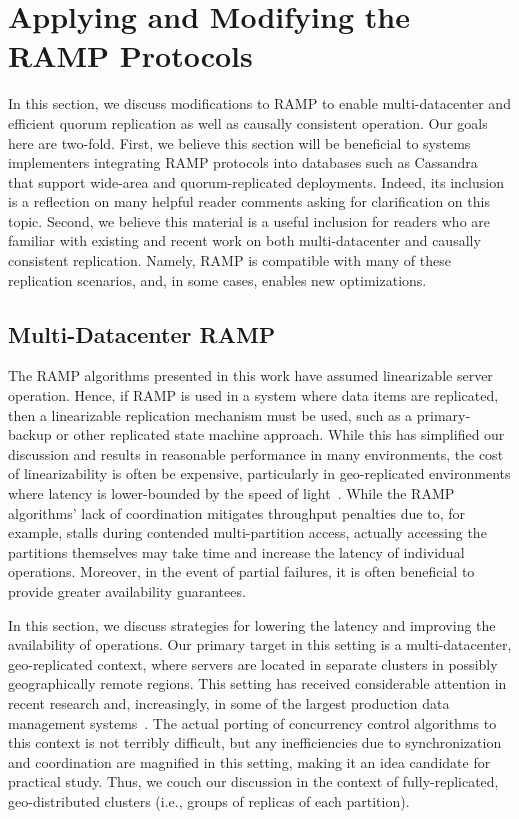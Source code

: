 
\section{Applying and Modifying the RAMP Protocols}
\label{sec:ramp-application}

In this section, we discuss modifications to RAMP to enable multi-datacenter and efficient quorum replication as well as causally consistent operation. Our goals here are two-fold. First, we believe this section will be beneficial to systems implementers integrating RAMP protocols into databases such as Cassandra~\cite{cassandra-sigmod} that support wide-area and quorum-replicated deployments. Indeed, its inclusion is a reflection on many helpful reader comments asking for clarification on this topic. Second, we believe this material is a useful inclusion for readers who are familiar with existing and recent work on both multi-datacenter and causally consistent replication. Namely, RAMP is compatible with many of these replication scenarios, and, in some cases, enables new optimizations.

\subsection{Multi-Datacenter RAMP}
\label{sec:multidc}

The RAMP algorithms presented in this work have assumed linearizable server operation. Hence, if RAMP is used in a system where data items are replicated, then a linearizable replication mechanism must be used, such as a primary-backup or other replicated state machine approach. While this has simplified our discussion and results in reasonable performance in many environments, the cost of linearizability is often be expensive, particularly in geo-replicated environments where latency is lower-bounded by the speed of light~\cite{hat-vldb,pacelc}. While the RAMP algorithms' lack of coordination mitigates throughput penalties due to, for example, stalls during contended multi-partition access, actually accessing the partitions themselves may take time and increase the latency of individual operations. Moreover, in the event of partial failures, it is often beneficial to provide greater availability guarantees.

In this section, we discuss strategies for lowering the latency and improving the availability of operations. Our primary target in this setting is a multi-datacenter, geo-replicated context, where servers are located in separate clusters in possibly geographically remote regions. This setting has received considerable attention in recent research and, increasingly, in some of the largest production data management systems~\cite{walter,cops,eiger,spanner}. The actual porting of concurrency control algorithms to this context is not terribly difficult, but any inefficiencies due to synchronization and coordination are magnified in this setting, making it an idea candidate for practical study. Thus, we couch our discussion in the context of fully-replicated, geo-distributed clusters (i.e., groups of replicas of each partition).

